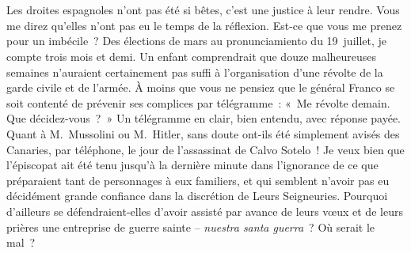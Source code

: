 \documentclass[french,twoside]{book} %
\newcommand{\astertri}{\medskip\par\centerline{\color{rubric}\large\selectfont{\syms ✻\,✻\,✻}}\medskip\par}%
\begin{document}
 \par

\astertri

\noindent  \par
Les droites espagnoles n’ont pas été si bêtes, c’est une justice à leur rendre. Vous me direz qu’elles n’ont pas eu le temps de la réflexion. Est-ce que vous me prenez pour un imbécile ? Des élections de mars au pronunciamiento du 19 juillet, je compte trois mois et demi. Un enfant comprendrait que douze malheureuses semaines n’auraient certainement pas suffi à l’organisation d’une révolte de la garde civile et de l’armée. À moins que vous ne pensiez que le général Franco se soit contenté de prévenir ses complices par télégramme : « Me révolte demain. Que décidez-vous ? » Un télégramme en clair, bien entendu, avec réponse payée. Quant à M. Mussolini ou M. Hitler, sans doute ont-ils été simplement avisés des Canaries, par téléphone, le jour de l’assassinat de Calvo Sotelo ! Je veux bien que l’épiscopat ait été tenu jusqu’à la dernière minute dans l’ignorance de ce que préparaient tant de personnages à eux familiers, et qui semblent n’avoir pas eu décidément grande confiance dans la discrétion de Leurs Seigneuries. Pourquoi d’ailleurs se défendraient-elles d’avoir assisté par avance de leurs vœux et de leurs prières une entreprise de guerre sainte – \emph{nuestra santa guerra} ? Où serait le mal ?\par
\end{document}
